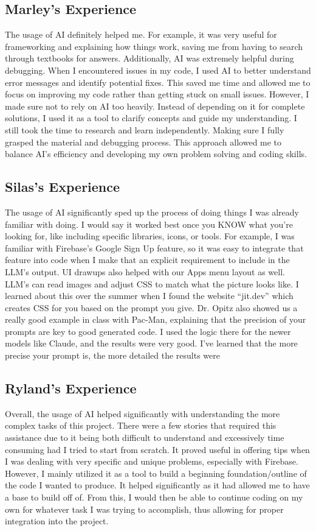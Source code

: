 \subsection{Marley's Experience}
The usage of AI definitely helped me. For example, it was very useful for frameworking and explaining how things work, saving me from having to search through textbooks for answers. Additionally, AI was extremely helpful during debugging. When I encountered issues in my code, I used AI to better understand error messages and identify potential fixes. This saved me time and allowed me to focus on improving my code rather than getting stuck on small issues. However, I made sure not to rely on AI too heavily. Instead of depending on it for complete solutions, I used it as a  tool to clarify concepts and guide my understanding. I still took the time to research and learn independently. Making sure I fully grasped the material and debugging process. This approach allowed me to balance AI's efficiency and developing my own problem solving and coding skills.

\subsection{Silas's Experience}
The usage of AI significantly sped up the process of doing things I was already familiar with doing. I would say it worked best once you KNOW what you’re looking for, like including specific libraries, icons, or tools. For example, I was familiar with Firebase’s Google Sign Up feature, so it was easy to integrate that feature into code when I make that an explicit requirement to include in the LLM’s output. UI drawups also helped with our Apps menu layout as well. LLM’s can read images and adjust CSS to match what the picture looks like. I learned about this over the summer when I found the website “jit.dev” which creates CSS for you based on the prompt you give. Dr. Opitz also showed us a really good example in class with Pac-Man, explaining that the precision of your prompts are key to good generated code. I used the logic there for the newer models like Claude, and the results were very good. I’ve learned that the more precise your prompt is, the more detailed the results were

\subsection{Ryland's Experience}
Overall, the usage of AI helped significantly with understanding the more complex tasks of this project. There were a few stories that required this assistance due to it being both difficult to understand and excessively time consuming had I tried to start from scratch. It proved useful in offering tips when I was dealing with very specific and unique problems, especially with Firebase. However, I mainly utilized it as a tool to build a beginning foundation/outline of the code I wanted to produce. It helped significantly as it had allowed me to have a base to build off of. From this, I would then be able to continue coding on my own for whatever task I was trying to accomplish, thus allowing for proper integration into the project.

